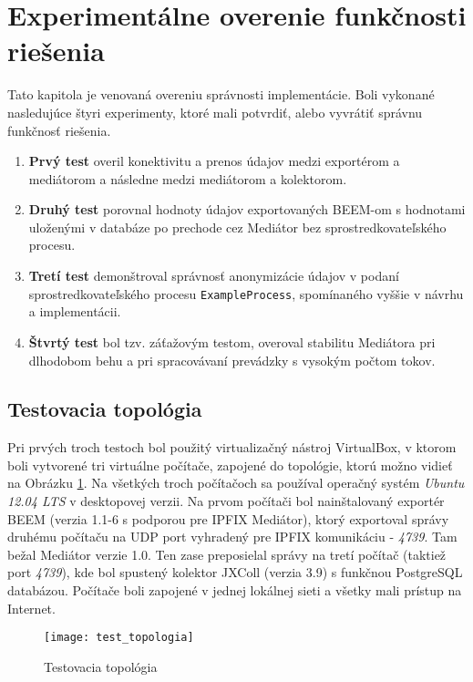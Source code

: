 \section{Experimentálne overenie funkčnosti riešenia}

Tato kapitola je venovaná overeniu správnosti implementácie. Boli vykonané nasledujúce štyri experimenty, 
ktoré mali potvrdiť, alebo vyvrátiť správnu funkčnosť riešenia. 
\begin{enumerate}
 \item \textbf{Prvý test} overil konektivitu a prenos údajov medzi exportérom a mediátorom a následne medzi 
 mediátorom a kolektorom.
 \item \textbf{Druhý test} porovnal hodnoty údajov exportovaných BEEM-om s hodnotami uloženými v databáze po prechode
 cez Mediátor bez sprostredkovateľského procesu.
 \item \textbf{Tretí test} demonštroval správnosť anonymizácie údajov v podaní sprostredkovateľského procesu 
 \verb|ExampleProcess|, spomínaného vyššie v návrhu a implementácii.
 \item \textbf{Štvrtý test} bol tzv. záťažovým testom, overoval stabilitu Mediátora pri dlhodobom behu a 
 pri spracovávaní prevádzky s vysokým počtom tokov.
\end{enumerate}


\subsection{Testovacia topológia}

Pri prvých troch testoch bol použitý virtualizačný nástroj VirtualBox, v ktorom boli vytvorené tri virtuálne 
počítače, zapojené do topológie, ktorú možno vidieť na Obrázku \ref{o:test_topologia}.
Na všetkých troch počítačoch sa používal operačný systém \emph{Ubuntu 12.04 LTS} v desktopovej verzii. Na 
prvom počítači bol nainštalovaný exportér BEEM (verzia 1.1-6 s podporou pre IPFIX Mediátor), ktorý 
exportoval správy druhému počítaču na UDP port vyhradený pre IPFIX komunikáciu - \emph{4739}. Tam bežal 
Mediátor verzie 1.0. Ten zase preposielal správy na tretí počítač (taktiež port \emph{4739}), kde bol 
spustený kolektor JXColl (verzia 3.9) s funkčnou PostgreSQL databázou. Počítače boli zapojené v jednej 
lokálnej sieti a všetky mali prístup na Internet.

\begin{figure}[ht!]
\centering
\texttt{[image: test\_topologia]}
\caption{Testovacia topológia}\label{o:test_topologia}
\end{figure}

